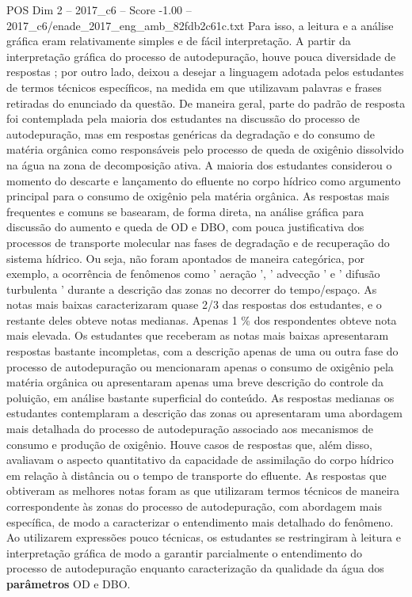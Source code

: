 \begin{textsample}{POS Dim 2 – 2017\_c6 – Score -1.00 – 2017\_c6/enade\_2017\_eng\_amb\_82fdb2c61c.txt}
Para isso, a leitura e a análise gráfica eram relativamente simples e de fácil interpretação.
A partir da interpretação gráfica do processo de autodepuração, houve pouca diversidade de respostas ; por outro lado, deixou a desejar a linguagem adotada pelos estudantes de termos técnicos específicos, na medida em que utilizavam palavras e frases retiradas do enunciado da questão.
De maneira geral, parte do padrão de resposta foi contemplada pela maioria dos estudantes na discussão do processo de autodepuração, mas em respostas genéricas da degradação e do consumo de matéria orgânica como responsáveis pelo processo de queda de oxigênio dissolvido na água na zona de decomposição ativa.
A maioria dos estudantes considerou o momento do descarte e lançamento do efluente no corpo hídrico como argumento principal para o consumo de oxigênio pela matéria orgânica.
As respostas mais frequentes e comuns se basearam, de forma direta, na análise gráfica para discussão do aumento e queda de OD e DBO, com pouca justificativa dos processos de transporte molecular nas fases de degradação e de recuperação do sistema hídrico.
Ou seja, não foram apontados de maneira categórica, por exemplo, a ocorrência de fenômenos como ' aeração ', ' advecção ' e ' difusão turbulenta ' durante a descrição das zonas no decorrer do tempo/espaço.
As notas mais baixas caracterizaram quase 2/3 das respostas dos estudantes, e o restante deles obteve notas medianas.
Apenas 1 \% dos respondentes obteve nota mais elevada.
Os estudantes que receberam as notas mais baixas apresentaram respostas bastante incompletas, com a descrição apenas de uma ou outra fase do processo de autodepuração ou mencionaram apenas o consumo de oxigênio pela matéria orgânica ou apresentaram apenas uma breve descrição do controle da poluição, em análise bastante superficial do conteúdo.
As respostas medianas os estudantes contemplaram a descrição das zonas ou apresentaram uma abordagem mais detalhada do processo de autodepuração associado aos mecanismos de consumo e produção de oxigênio.
Houve casos de respostas que, além disso, avaliavam o aspecto quantitativo da capacidade de assimilação do corpo hídrico em relação à distância ou o tempo de transporte do efluente.
As respostas que obtiveram as melhores notas foram as que utilizaram termos técnicos de maneira correspondente às zonas do processo de autodepuração, com abordagem mais específica, de modo a caracterizar o entendimento mais detalhado do fenômeno.
Ao utilizarem expressões pouco técnicas, os estudantes se restringiram à leitura e interpretação gráfica de modo a garantir parcialmente o entendimento do processo de autodepuração enquanto caracterização da qualidade da água dos \textbf{parâmetros} OD e DBO.

\end{textsample}
